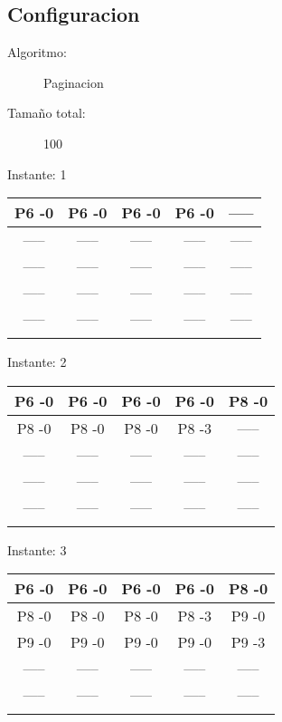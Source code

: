 \documentclass[10pt,a4paper]{article}
\begin{document}
\begin{center}
\section*{Configuracion}
\begin{description}
\item[Algoritmo:] Paginacion 
\item[Tamaño total:] 100 
\end{description}
\end{center}
\begin{center}

Instante: 1

\hfill 
\hfill 
\hfill 
\break 
\begin{tabular}	{ccccc}
\hline  P6 -0 &   P6 -0 &   P6 -0 &   P6 -0 &   ----- &  \\\hline  ----- &   ----- &   ----- &   ----- &   ----- &  \\\hline  ----- &   ----- &   ----- &   ----- &   ----- &  \\\hline  ----- &   ----- &   ----- &   ----- &   ----- &  \\\hline  ----- &   ----- &   ----- &   ----- &   ----- &  \\\hfill 
\hfill 
\hfill 
\break 
\end{tabular}
\end{center}
\pagebreak
\begin{center}

Instante: 2

\hfill 
\hfill 
\hfill 
\break 
\begin{tabular}	{ccccc}
\hline  P6 -0 &   P6 -0 &   P6 -0 &   P6 -0 &   P8 -0 &  \\\hline  P8 -0 &   P8 -0 &   P8 -0 &   P8 -3 &   ----- &  \\\hline  ----- &   ----- &   ----- &   ----- &   ----- &  \\\hline  ----- &   ----- &   ----- &   ----- &   ----- &  \\\hline  ----- &   ----- &   ----- &   ----- &   ----- &  \\\hfill 
\hfill 
\hfill 
\break 
\end{tabular}
\end{center}
\pagebreak
\begin{center}

Instante: 3

\hfill 
\hfill 
\hfill 
\break 
\begin{tabular}	{ccccc}
\hline  P6 -0 &   P6 -0 &   P6 -0 &   P6 -0 &   P8 -0 &  \\\hline  P8 -0 &   P8 -0 &   P8 -0 &   P8 -3 &   P9 -0 &  \\\hline  P9 -0 &   P9 -0 &   P9 -0 &   P9 -0 &   P9 -3 &  \\\hline  ----- &   ----- &   ----- &   ----- &   ----- &  \\\hline  ----- &   ----- &   ----- &   ----- &   ----- &  \\\hfill 
\hfill 
\hfill 
\break 
\end{tabular}
\end{center}
\end{document}
